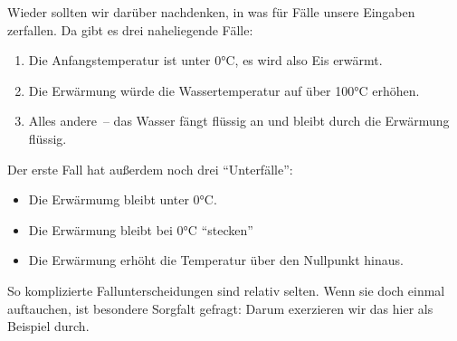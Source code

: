 %
Wieder sollten wir darüber nachdenken, in was für Fälle unsere
Eingaben zerfallen.  Da gibt es drei naheliegende Fälle:
%
\begin{enumerate}
\item Die Anfangstemperatur ist unter 0°C, es wird also Eis erwärmt.
\item Die Erwärmung würde die Wassertemperatur auf über 100°C erhöhen.
\item Alles andere~-- das Wasser fängt flüssig an und bleibt durch die
  Erwärmung flüssig.
\end{enumerate}
%
Der erste Fall hat außerdem noch drei "`Unterfälle"':
%
\begin{itemize}
\item Die Erwärmumg bleibt unter 0°C.
\item Die Erwärmung bleibt bei  0°C "`stecken"'
\item Die Erwärmung erhöht die Temperatur über den Nullpunkt hinaus.
\end{itemize}
%
So komplizierte Fallunterscheidungen sind relativ selten. Wenn sie
doch einmal auftauchen, ist besondere Sorgfalt gefragt: Darum
exerzieren wir das hier als Beispiel durch.

